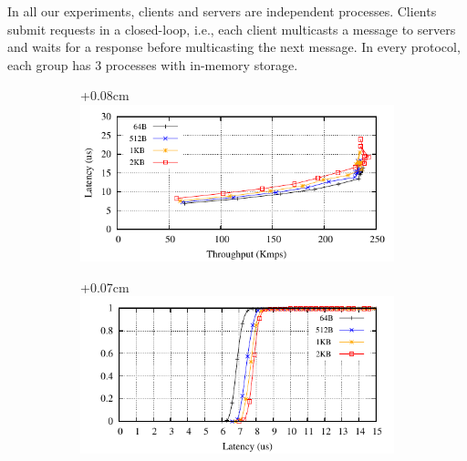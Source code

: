 In all our experiments, clients and servers are independent processes. 
Clients submit requests in a closed-loop, i.e., each client multicasts a message to servers and waits for a response before multicasting the next message. 
In every protocol, each group has 3 processes with in-memory storage.


\begin{figure}[ht]
  \begin{subfigure}{\columnwidth}
    \advance\leftskip+0.08cm
    \includegraphics[width=0.97\columnwidth]{figures/benchmark/graphs/figure-performance-vs-size-single-group-up-to-4k}
  \end{subfigure}
  \begin{subfigure}{\columnwidth}
    \advance\leftskip+0.07cm
    \includegraphics[width=0.96\columnwidth]{figures/benchmark/graphs/figure-performance-vs-size-single-group-cdf-up-to-4k}

\end{subfigure}
\end{figure}
